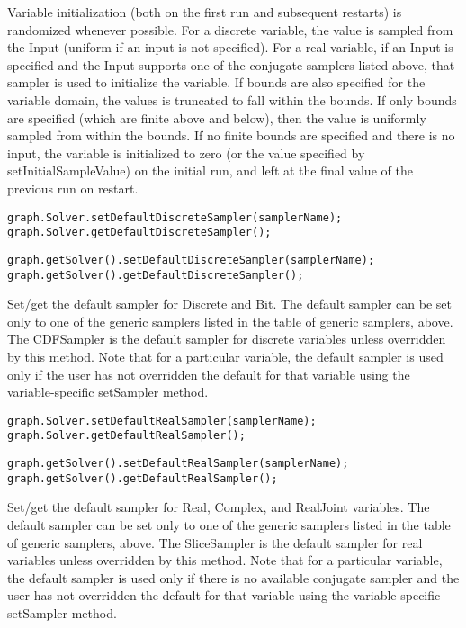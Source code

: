 Variable initialization (both on the first run and subsequent restarts) is randomized whenever possible.  For a discrete variable, the value is sampled from the Input (uniform if an input is not specified).  For a real variable, if an Input is specified and the Input supports one of the conjugate samplers listed above, that sampler is used to initialize the variable.  If bounds are also specified for the variable domain, the values is truncated to fall within the bounds.  If only bounds are specified (which are finite above and below), then the value is uniformly sampled from within the bounds.  If no finite bounds are specified and there is no input, the variable is initialized to zero (or the value specified by setInitialSampleValue) on the initial run, and left at the final value of the previous run on restart.


\ifmatlab
\begin{lstlisting}
graph.Solver.setDefaultDiscreteSampler(samplerName);
graph.Solver.getDefaultDiscreteSampler();
\end{lstlisting}
\fi

\ifjava
\begin{lstlisting}
graph.getSolver().setDefaultDiscreteSampler(samplerName);
graph.getSolver().getDefaultDiscreteSampler();
\end{lstlisting}
\fi

Set/get the default sampler for Discrete and Bit.  The default sampler can be set only to one of the generic samplers listed in the table of generic samplers, above.  The CDFSampler is the default sampler for discrete variables unless overridden by this method.  Note that for a particular variable, the default sampler is used only if the user has not overridden the default for that variable using the variable-specific setSampler method.

\ifmatlab
\begin{lstlisting}
graph.Solver.setDefaultRealSampler(samplerName);
graph.Solver.getDefaultRealSampler();
\end{lstlisting}
\fi

\ifjava
\begin{lstlisting}
graph.getSolver().setDefaultRealSampler(samplerName);
graph.getSolver().getDefaultRealSampler();
\end{lstlisting}
\fi

Set/get the default sampler for Real, Complex, and RealJoint variables.  The default sampler can be set only to one of the generic samplers listed in the table of generic samplers, above.  The SliceSampler is the default sampler for real variables unless overridden by this method.  Note that for a particular variable, the default sampler is used only if there is no available conjugate sampler and the user has not overridden the default for that variable using the variable-specific setSampler method.


